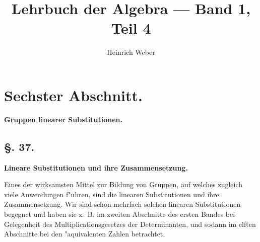 \documentclass[12pt,a4paper]{article}
\title{Lehrbuch der Algebra --- Band 1, Teil 4}
\author{Heinrich Weber}
\date{}
\theoremstyle{weber}
\begin{document}
\maketitle
\thispagestyle{empty}

\setcounter{section}{36}
\setcounter{page}{151}


\section*{Sechster Abschnitt.}

\begin{center}
\Large\textbf{Gruppen linearer Substitutionen.}
\end{center}

\bigskip

\subsection*{\S. 37.}

\begin{center}
\textbf{Lineare Substitutionen und ihre Zusammensetzung.}
\end{center}

\bigskip

Eines der wirksamsten Mittel zur Bildung von Gruppen, auf welches zugleich viele Anwendungen f"uhren, sind die linearen Substitutionen und ihre Zusammensetzung. Wir sind schon mehrfach solchen linearen Substitutionen begegnet und haben sie z.~B. im zweiten Abschnitte des ersten Bandes bei Gelegenheit des Multiplicationsgesetzes der Determinanten, und sodann im elften Abschnitte bei den "aquivalenten Zahlen betrachtet.
\end{document}
